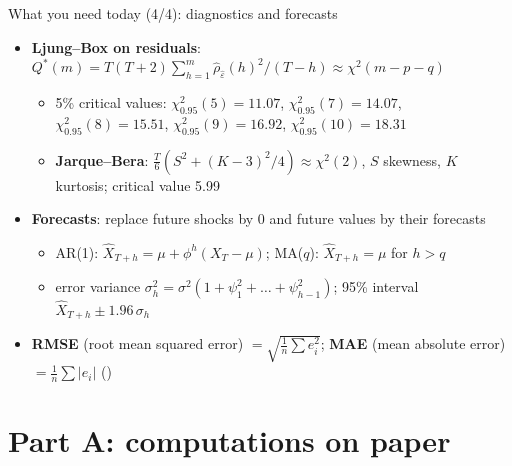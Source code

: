\begin{frame}{What you need today (4/4): diagnostics and forecasts}
\itemsize{\small}
\begin{itemize}
    \item \textbf{Ljung--Box on residuals}: $Q^*(m) = T(T + 2)\sum_{h=1}^{m}\hat\rho_{\hat\varepsilon}(h)^2/(T - h) \approx \chi^2(m - p - q)$
    \begin{itemize}
        \item 5\% critical values: $\chi^2_{0.95}(5) = 11.07$, $\chi^2_{0.95}(7) = 14.07$, $\chi^2_{0.95}(8) = 15.51$, $\chi^2_{0.95}(9) = 16.92$, $\chi^2_{0.95}(10) = 18.31$
        \item \textbf{Jarque--Bera}: $\frac{T}{6}(S^2 + (K - 3)^2/4) \approx \chi^2(2)$, $S$ skewness, $K$ kurtosis; critical value 5.99
    \end{itemize}
    \item \textbf{Forecasts}: replace future shocks by 0 and future values by their forecasts
    \begin{itemize}
        \item AR(1): $\hat X_{T+h} = \mu + \phi^h(X_T - \mu)$; MA($q$): $\hat X_{T+h} = \mu$ for $h > q$
        \item error variance $\sigma_h^2 = \sigma^2(1 + \psi_1^2 + \dots + \psi_{h-1}^2)$; 95\% interval $\hat X_{T+h} \pm 1.96\,\sigma_h$
    \end{itemize}
    \item \textbf{RMSE} (root mean squared error) $= \sqrt{\frac1n\sum e_i^2}$; \textbf{MAE} (mean absolute error) $= \frac1n\sum|e_i|$ ()
\end{itemize}
\end{frame}


\section{Part A: computations on paper}

